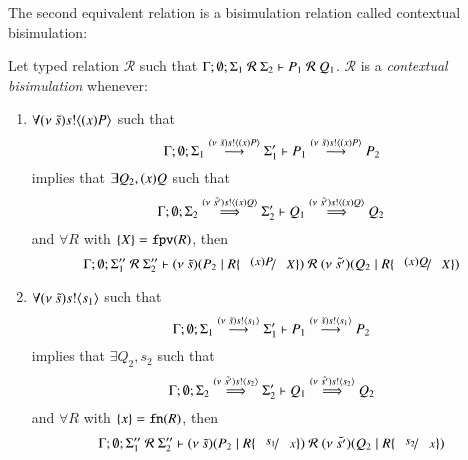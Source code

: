 The second equivalent relation is a bisimulation relation called
contextual bisimulation:
\begin{definition}\rm
	Let typed relation $\mathcal{R}$ such that $\Gamma; \emptyset; \Sigma_1\ \mathcal{R}\ \Sigma_2 \proves P_1\ \mathcal{R}\ Q_1$.
	$\mathcal{R}$ is a {\em contextual bisimulation} whenever:
	\begin{enumerate}
		\item	$\forall (\nu\ \tilde{s}) s ! \langle (x)P \rangle$ such that
			\[
				\Gamma; \emptyset; \Sigma_1 \stackrel{(\nu\ \tilde{s}) s ! \langle (x)P \rangle}{\longrightarrow} \Sigma_1' \vdash P_1 \stackrel{(\nu\ \tilde{s}) s ! \langle (x)P \rangle}{\longrightarrow} P_2
			\]
			implies that $\exists Q_2, (x)Q$ such that
			\[
				\Gamma; \emptyset; \Sigma_2 \stackrel{(\nu\ \tilde{s'}) s ! \langle (x)Q \rangle}{\Longrightarrow} \Sigma_2' \vdash Q_1 \stackrel{(\nu\ \tilde{s'}) s ! \langle (x)Q \rangle}{\Longrightarrow} Q_2
			\]
			and $\forall R$ with $\{X\} = \mathtt{fpv}(R)$, %
			then
			\[
				\Gamma; \emptyset; \Sigma_1''\ \mathcal{R}\ \Sigma_2'' \proves \newsp{\tilde{s}}{P_2 \Par R\subst{(x) P}{X}}\ \mathcal{R}\ 
				\newsp{\tilde{s'}}{Q_2 \Par R\subst{(x) Q}{X}}
			\]
		\item	$\forall (\nu\ \tilde{s}) s ! \langle s_1 \rangle$ such that
			\[
				\Gamma; \emptyset; \Sigma_1 \stackrel{(\nu\ \tilde{s}) s ! \langle s_1 \rangle}{\longrightarrow} \Sigma_1' \vdash P_1 \stackrel{(\nu\ \tilde{s}) s ! \langle s_1 \rangle}{\longrightarrow} P_2
			\]
			implies that $\exists Q_2, s_2$ such that
			\[
				\Gamma; \emptyset; \Sigma_2 \stackrel{(\nu\ \tilde{s'}) s ! \langle s_2 \rangle}{\Longrightarrow} \Sigma_2' \vdash Q_1 \stackrel{(\nu\ \tilde{s'}) s ! \langle s_2 \rangle}{\Longrightarrow} Q_2
			\]
			and $\forall R$ with $\{x\} = \mathtt{fn}(R)$, %
			then
			\[
				\Gamma; \emptyset; \Sigma_1''\ \mathcal{R}\ \Sigma_2'' \proves \newsp{\tilde{s}}{P_2 \Par R \subst{s_1}{x}}\ \mathcal{R}\ 
				\newsp{\tilde{s'}}{Q_2 \Par R \subst{s_2}{x}}
			\]


\end{enumerate}
\end{definition}
